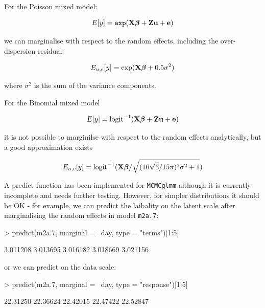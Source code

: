 \documentclass{article}
\begin{document}
For the Poisson mixed model:

\begin{equation}
E[y] = \texttt{exp}({\bf X}{\bm \beta}+{\bf Z}{\bf u}+{\bf e})
\end{equation}

we can marginalise with respect to the random effects, including the over-dispersion residual:

\begin{equation}
E_{{u,e}}[y] = \textrm{exp}({\bf X}{\bm \beta}+0.5\sigma^{2})
\end{equation}

where $\sigma^{2}$ is the sum of the variance components.

For the Binomial mixed model

\begin{equation}
E[y] = \textrm{logit}^{-1}({\bf X}{\bm \beta}+{\bf Z}{\bf u}+{\bf e})
\end{equation}

it is not possible to marginilse with respect to the random effects analytically, but a good approximation exists \citep{Diggle.2004}

\begin{equation}
E_{{u,e}}[y] = \textrm{logit}^{-1}({\bf X}{\bm \beta}/\sqrt{(16\sqrt{3}/15\pi)^{2}\sigma^{2}+1})
\end{equation}

A predict function has been implemented for \texttt{MCMCglmm} although it is currently incomplete and needs further testing. However, for simpler distributions it should be OK - for example, we can predict the laibality on the latent scale after marginalising the random effects in model \texttt{m2a.7}:

\begin{Schunk}
\begin{Sinput}
> predict(m2a.7, marginal = ~day, type = "terms")[1:5]
\end{Sinput}
\begin{Soutput}
[1] 3.011208 3.013695 3.016182 3.018669 3.021156
\end{Soutput}
\end{Schunk}

or we can predict on the data scale:

\begin{Schunk}
\begin{Sinput}
> predict(m2a.7, marginal = ~day, type = "response")[1:5]
\end{Sinput}
\begin{Soutput}
[1] 22.31250 22.36624 22.42015 22.47422 22.52847
\end{Soutput}
\end{Schunk}
\end{document}

